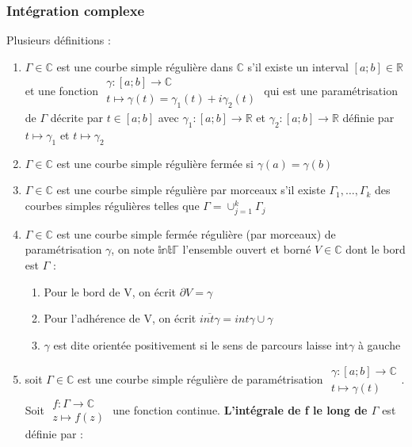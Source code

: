 \documentclass[../main.tex]{subfiles}
\begin{document}
\subsubsection{Intégration complexe}
Plusieurs définitions :\\
\begin{enumerate}
    \item $\Gamma \in \mathbb{C}$ est une courbe simple régulière dans $\mathbb{C}$ s'il existe un interval $[a;b] \in \mathbb{R}$ et une fonction $\begin{matrix}\gamma:[a;b]\rightarrow \mathbb{C}\\ t\mapsto \gamma(t) = \gamma_1(t)+i \gamma_2(t) \end{matrix}$ qui est une paramétrisation de $\Gamma$ décrite par $t\in [a;b]$ avec $\gamma_1:[a;b]\rightarrow \mathbb{R}$ et $\gamma_2:[a;b] \rightarrow \mathbb{R}$ définie par $t\mapsto \gamma_1$ et $t\mapsto \gamma_2$\\
    \item $\Gamma \in \mathbb{C}$ est une courbe simple régulière fermée si $\gamma(a)=\gamma(b)$\\
    \item $\Gamma \in \mathbb{C}$ est une courbe simple régulière par morceaux s'il existe $\Gamma_1, \dots, \Gamma_k$ des courbes simples régulières telles que $\Gamma = \cup_{j=1}^k\Gamma_j$\\
    \item $\Gamma \in \mathbb{C}$ est une courbe simple fermée régulière (par morceaux) de paramétrisation $\gamma$, on note $\mathbb{int\Gamma}$ l'ensemble ouvert et borné $V\in \mathbb{C}$ dont le bord est $\Gamma$ : \begin{enumerate}
        \item Pour le bord de V, on écrit $\partial V = \gamma$\\
        \item Pour l'adhérence de V, on écrit $\overline{int \gamma} = int\gamma \cup \gamma$\\
        \item $\gamma$ est dite orientée positivement si le sens de parcours laisse int$\gamma$ à gauche\\
    \end{enumerate}
    \item soit $\Gamma \in \mathbb{C}$ est une courbe simple régulière de paramétrisation $\begin{matrix}\gamma:[a;b]\rightarrow \mathbb{C}\\ t\mapsto \gamma(t)\end{matrix}$. Soit $\begin{matrix}f:\Gamma \rightarrow \mathbb{C}\\ z\mapsto f(z)\end{matrix}$ une fonction continue. \textbf{L'intégrale de f le long de $\Gamma$} est définie par :\\

\end{enumerate}
\end{document}
